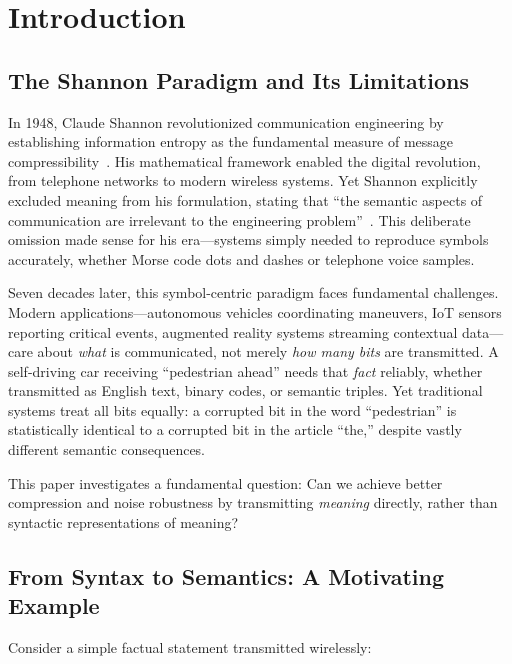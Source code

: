 \documentclass[conference]{IEEEtran}
\begin{document}
\section{Introduction}

\subsection{The Shannon Paradigm and Its Limitations}

In 1948, Claude Shannon revolutionized communication engineering by 
establishing information entropy as the fundamental measure of message 
compressibility~\cite{Shannon1948}. His mathematical framework enabled 
the digital revolution, from telephone networks to modern wireless systems. 
Yet Shannon explicitly excluded meaning from his formulation, stating 
that ``the semantic aspects of communication are irrelevant to the 
engineering problem''~\cite[p.~379]{Shannon1948}. This deliberate omission 
made sense for his era—systems simply needed to reproduce symbols accurately, 
whether Morse code dots and dashes or telephone voice samples.

Seven decades later, this symbol-centric paradigm faces fundamental 
challenges. Modern applications—autonomous vehicles coordinating maneuvers, 
IoT sensors reporting critical events, augmented reality systems streaming 
contextual data—care about \textit{what} is communicated, not merely 
\textit{how many bits} are transmitted. A self-driving car receiving 
``pedestrian ahead'' needs that \textit{fact} reliably, whether transmitted 
as English text, binary codes, or semantic triples. Yet traditional systems 
treat all bits equally: a corrupted bit in the word ``pedestrian'' is 
statistically identical to a corrupted bit in the article ``the,'' despite 
vastly different semantic consequences.

This paper investigates a fundamental question: Can we achieve better 
compression and noise robustness by transmitting \textit{meaning} directly, 
rather than syntactic representations of meaning?

\subsection{From Syntax to Semantics: A Motivating Example}

Consider a simple factual statement transmitted wirelessly:
\end{document}
